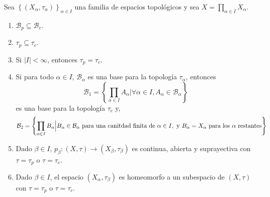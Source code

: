 \documentclass[12pt]{report}
\theoremstyle{largebreak}
\newcommand\cf[3]{\ensuremath{#1:#2\rightarrow#3}}
\begin{document}
    \begin{propo}
        Sea $\left\{(X_\alpha,\tau_\alpha) \right\}_{ \alpha\in I}$ una familia de espacios topológicos y sea $X=\prod_{\alpha\in I}X_\alpha$.
        \begin{enumerate}
            \item $\mathcal{B}_p\subseteq\mathcal{B}_c$.
            \item $\tau_p\subseteq\tau_c$.
            \item Si $|I|<\infty$, entonces $\tau_p=\tau_c$.
            \item Si para todo $\alpha\in I$, $\mathcal{B}_\alpha$ es una base para la topología $\tau_\alpha$, entonces
            \begin{equation*}
                \mathcal{B}_1=\left\{\prod_{\alpha\in I}A_\alpha\Big|\forall \alpha\in I, A_\alpha\in\mathcal{B}_\alpha \right\}
            \end{equation*}
            es una base para la topología $\tau_c$ y,
            \begin{equation*}
                \mathcal{B}_2=\left\{\prod_{\alpha\in I}B_\alpha\Big|B_\alpha\in\mathcal{B}_\alpha\textup{ para una canitdad finita de } \alpha\in I,\textup{ y }B_\alpha=X_\alpha\textup{ para los $\alpha$ restantes}  \right\}
            \end{equation*}
            \item Dado $\beta\in I$, $\cf{p_\beta}{(X,\tau)}{(X_\beta,\tau_\beta)}$ es continua, abierta y suprayectiva con $\tau=\tau_p$ o $\tau=\tau_c$.
            \item Dado $\beta\in I$, el espacio $(X_\alpha,\tau_\beta)$ es homeomorfo a un subespacio de $(X,\tau)$ con $\tau=\tau_p$ o $\tau=\tau_c$.
        \end{enumerate}
    \end{propo}
\end{document}
